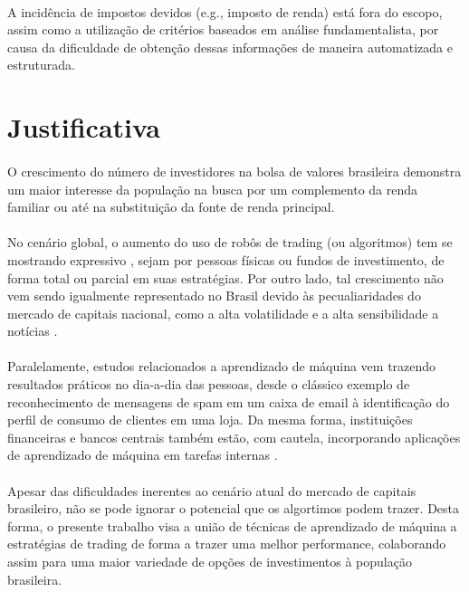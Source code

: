 \paragraph{} A incidência de impostos devidos (e.g., imposto de renda) está fora do escopo, assim como a utilização de critérios baseados em análise fundamentalista, por causa da dificuldade de obtenção dessas informações de maneira automatizada e estruturada.

\section{Justificativa}

\paragraph{} O crescimento do número de investidores na bolsa de valores brasileira \cite{aumento_investidores} demonstra um maior interesse da população na busca por um complemento da renda familiar ou até na substituição da fonte de renda principal.

\paragraph{} No cenário global, o aumento do uso de robôs de trading (ou algoritmos) tem se mostrando expressivo \cite{robos_investidores}, sejam por pessoas físicas ou fundos de investimento, de forma total ou parcial em suas estratégias. Por outro lado, tal crescimento não vem sendo igualmente representado no Brasil devido às pecualiaridades do mercado de capitais nacional, como a alta volatilidade e a alta sensibilidade a notícias \cite{robos_e_fundos}.

\paragraph{} Paralelamente, estudos relacionados a aprendizado de máquina vem trazendo resultados práticos no dia-a-dia das pessoas, desde o clássico exemplo de reconhecimento de mensagens de spam em um caixa de email à identificação do perfil de consumo de clientes em uma loja. Da mesma forma, instituições financeiras e bancos centrais também estão, com cautela, incorporando aplicações de aprendizado de máquina em tarefas internas \cite{fernandez2019artificial}.

\paragraph{} Apesar das dificuldades inerentes ao cenário atual do mercado de capitais brasileiro, não se pode ignorar o potencial que os algortimos podem trazer. Desta forma, o presente trabalho visa a união de técnicas de aprendizado de máquina a estratégias de trading de forma a trazer uma melhor performance, colaborando assim para uma maior variedade de opções de investimentos à população brasileira.

